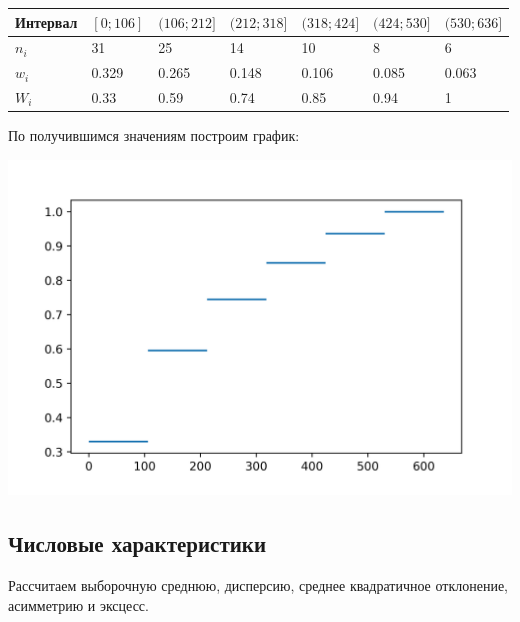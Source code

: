 \documentclass[titlepage]{article}
\begin{document}
\begin{table}[!ht]
    \centering
    \begin{tabular}{|l|l|l|l|l|l|l|}
    \hline
        Интервал & $[0; 106]$ & $(106; 212]$ & $(212; 318]$ & $(318; 424]$ & $(424; 530]$ & $(530; 636]$ \\ \hline
        $n_i$ & 31 & 25 & 14 & 10 & 8 & 6 \\ \hline
        $w_i$ & 0.329 & 0.265 & 0.148 & 0.106 & 0.085 & 0.063 \\ \hline
        $W_i$ & 0.33 & 0.59 & 0.74 & 0.85 & 0.94 & 1 \\ \hline
    \end{tabular}
\end{table}

По получившимся значениям построим график:

\includegraphics[scale=0.6]{fig02}

\subsection{Числовые характеристики}
Рассчитаем выборочную среднюю, дисперсию, среднее квадратичное отклонение, асимметрию и эксцесс.
\end{document}

